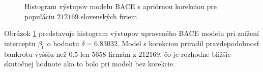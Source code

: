 \begin{figure}
\caption{Histogram výstupov modelu BACE s apriórnou korekciou pre populáciu \(212169\) slovenských firiem}
\label{model_bace_whole_pop_corrected}
\end{figure}

Obrázok \ref{model_bace_whole_pop_corrected} predstavuje histogram výstupov upraveného BACE modelu pri znížení interceptu \( \beta_0 \) o hodnotu \( \delta = 6.83032 \).
Model s korekciou priradil pravdepodobnosť bankrotu vyššiu než \(0.5\) len \(5658\) firmám z \(212169\), čo je rozhodne bližšie skutočnej hodnote ako to bolo pri modeli bez korekcie.